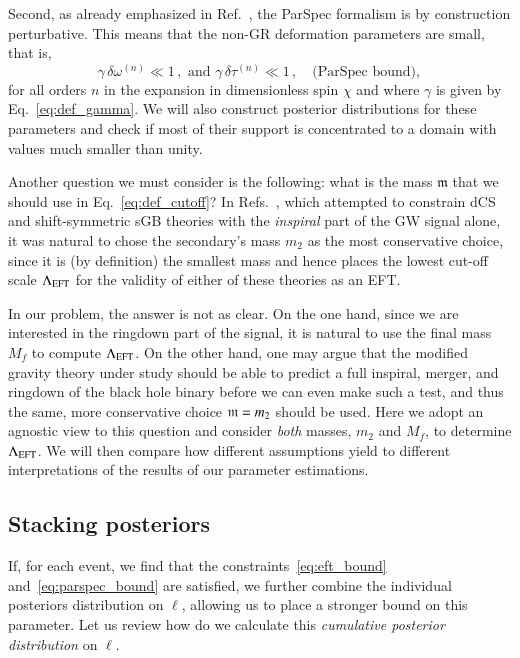 Second, as already emphasized in Ref.~\cite{Maselli:2019mjd}, the ParSpec
formalism is by construction perturbative. This means that the non-GR
deformation parameters are small, that is,
%
\begin{equation}
\gamma \, \delta \omega^{(n)} \ll 1 \,,
\,\, \textrm{and} \,\,
\gamma \, \delta \tau^{(n)} \ll 1 \,, \quad \textrm{(ParSpec bound)},
\label{eq:parspec_bound}
\end{equation}
%
for all orders $n$ in the expansion in dimensionless spin $\chi$ and where $\gamma$
is given by Eq.~\eqref{eq:def_gamma}.
%
We will also construct posterior distributions for these parameters and check if
most of their support is concentrated to a domain with values much smaller than
unity.

Another question we must consider is the following: what is the mass $\mathfrak{m}$ that we should use
in Eq.~\eqref{eq:def_cutoff}?
%
In Refs.~\cite{Nair:2019iur,Perkins:2021mhb,Lyu:2022gdr}, which attempted to
constrain dCS and shift-symmetric sGB theories with the \emph{inspiral} part of
the GW signal alone, it was natural to chose the secondary's mass $m_2$ as the most
conservative choice, since it is (by definition) the smallest mass and hence
places the lowest cut-off scale $\Lambda_{\rm EFT}$ for the validity of either of these theories as an EFT.

In our problem, the answer is not as clear. On the one hand, since we are
interested in the ringdown part of the signal, it is natural to use the
final mass $M_f$ to compute $\Lambda_{\rm EFT}$.
%
On the other hand, one may argue that the modified gravity theory under study
should be able to predict a full inspiral, merger, and ringdown of the black
hole binary before we can even make such a test, and thus the same, more conservative choice
$\mathfrak{m} = m_2$ should be used.
%
Here we adopt an agnostic view to this question and consider \emph{both} masses, $m_2$ and $M_f$, to
determine $\Lambda_{\rm EFT}$. We will then compare how different assumptions
yield to different interpretations of the results of our parameter estimations.


\iffalse
\subsection{Stacking posteriors}
\label{sec:stack}

If, for each event, we find that the constraints~\eqref{eq:eft_bound}
and~\eqref{eq:parspec_bound} are satisfied, we further combine the individual
posteriors distribution on $\ell$, allowing us to place a stronger bound on this parameter.
%
Let us review how do we calculate this \emph{cumulative posterior distribution} on $\ell$.

